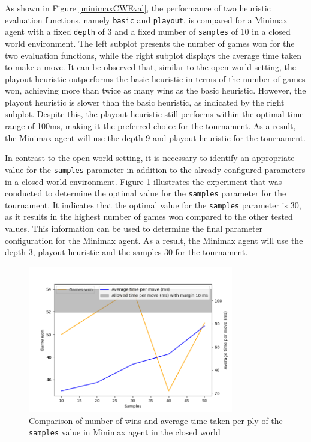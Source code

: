 As shown in Figure \ref{minimaxCWEval}, the performance of two heuristic evaluation functions, namely \texttt{basic} and \texttt{playout}, is compared for a Minimax agent with a fixed \texttt{depth} of 3 and a fixed number of \texttt{samples} of 10 in a closed world environment. The left subplot presents the number of games won for the two evaluation functions, while the right subplot displays the average time taken to make a move. It can be observed that, similar to the open world setting, the playout heuristic outperforms the basic heuristic in terms of the number of games won, achieving more than twice as many wins as the basic heuristic. However, the playout heuristic is slower than the basic heuristic, as indicated by the right subplot. Despite this, the playout heuristic still performs within the optimal time range of 100ms, making it the preferred choice for the tournament. As a result, the Minimax agent will use the depth 9 and playout heuristic for the tournament.

In contrast to the open world setting, it is necessary to identify an appropriate value for the \texttt{samples} parameter in addition to the already-configured parameters in a closed world environment. Figure \ref{minimaxCWSamples} illustrates the experiment that was conducted to determine the optimal value for the \texttt{samples} parameter for the tournament. It indicates that the optimal value for the \texttt{samples} parameter is 30, as it results in the highest number of games won compared to the other tested values. This information can be used to determine the final parameter configuration for the Minimax agent. As a result, the Minimax agent will use the depth 3, playout heuristic and the samples 30 for the tournament.

\begin{figure}[h]
  \centering
  \captionsetup{justification=centering}
  \includegraphics[width=0.8\textwidth]{../img/minimax_samples_closedworld.png}
  \caption{Comparison of number of wins and average time taken per ply of the \texttt{samples} value in Minimax agent in the closed world}
  \label{minimaxCWSamples}
\end{figure}




